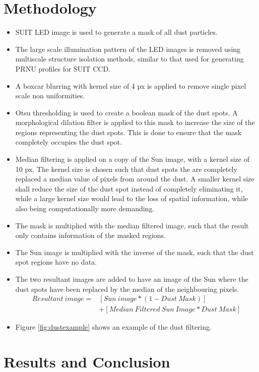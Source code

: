 \documentclass[11pt,a4paper]{article}
\begin{document}
	\section{Methodology}
	\begin{itemize}
		\item SUIT LED image is used to generate a mask of all dust particles.
		\item The large scale illumination pattern of the LED images is removed using multiscale structure isolation methods, similar to that used for generating PRNU profiles for SUIT CCD.
		\item A boxcar blurring with kernel size of 4 px is applied to remove single pixel scale non uniformities.
		\item Otsu thresholding is used to create a boolean mask of the dust spots. A morphological dilation filter is applied to this mask to increase the size of the regions representing the dust spots. This is done to ensure that the mask completely occupies the dust spot.
		\item Median filtering is applied on a copy of the Sun image, with a kernel size of 10 px. The kernel size is chosen such that dust spots the are completely replaced a median value of pixels from around the dust. A smaller kernel size shall reduce the size of the dust spot instead of completely eliminating it, while a large kernel size would lead to the loss of spatial information, while also being computationally more demanding.
		\item The mask is multiplied with the median filtered image, such that the result only contains information of the masked regions.
		\item The Sun image is multiplied with the inverse of the mask, such that the dust spot regions have no data.
		\item The two resultant images are added to have an image of the Sun where the dust spots have been replaced by the median of the neighbouring pixels.
		\begin{align*}
			Resultant~image = &[Sun~image * (1-Dust~Mask) ]\\
			&+ [Median~Filtered~Sun~Image * Dust~Mask]
		\end{align*}
		\item Figure \ref{fig:dustexample} shows an example of the dust filtering.
	\end{itemize}
	
	\section{Results and Conclusion}
	
\end{document}
